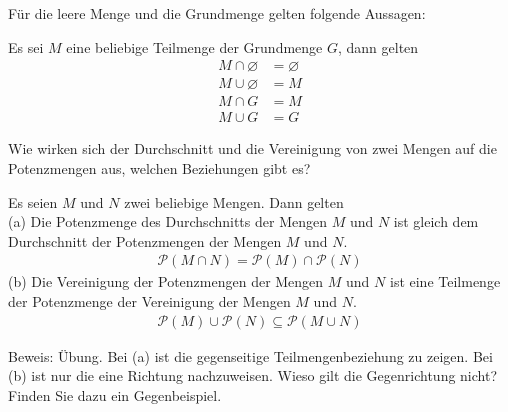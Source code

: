 \begin{Unit}[Bemerkung]
Für die leere Menge und die Grundmenge gelten folgende Aussagen:
\begin{Bemerkung}
  Es sei $M$ eine beliebige Teilmenge der Grundmenge $G$, dann gelten
  \begin{align}
    M \cap \varnothing &= \varnothing \\
    M \cup \varnothing &= M \\
    M \cap G &= M \\
    M \cup G &= G
  \end{align}
\end{Bemerkung}
\end{Unit}


\begin{Unit}[Bemerkung]
Wie wirken sich der Durchschnitt und die Vereinigung von zwei Mengen auf die 
Potenzmengen aus, welchen Beziehungen gibt es?

\begin{Bemerkung}
  Es seien $M$ und $N$ zwei beliebige Mengen. Dann gelten \\
  (a) Die Potenzmenge des Durchschnitts der Mengen $M$ und $N$ ist gleich 
  dem Durchschnitt der Potenzmengen der Mengen $M$ und $N$.
  \begin{align}
    \mathcal{P}(M \cap N) = \mathcal{P}(M) \cap \mathcal{P}(N) 
  \end{align}
  (b) Die Vereinigung der Potenzmengen der Mengen $M$ und $N$ ist eine 
  Teilmenge der Potenzmenge der Vereinigung der Mengen $M$ und $N$.
  \begin{align}
    \mathcal{P}(M) \cup \mathcal{P}(N) \subseteq \mathcal{P}(M \cup N) 
  \end{align}
\end{Bemerkung}

Beweis: Übung. Bei (a) ist die gegenseitige Teilmengenbeziehung zu zeigen. 
Bei (b) ist nur die eine Richtung nachzuweisen. Wieso gilt die Gegenrichtung 
nicht? Finden Sie dazu ein Gegenbeispiel.
\end{Unit}

